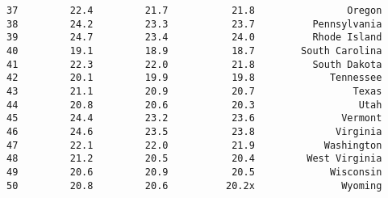 \documentclass[11pt]{article}
\begin{document}
\begin{Verbatim}[commandchars=\\\{\}]
37         22.4         21.7           21.8                Oregon   
38         24.2         23.3           23.7          Pennsylvania   
39         24.7         23.4           24.0          Rhode Island   
40         19.1         18.9           18.7        South Carolina   
41         22.3         22.0           21.8          South Dakota   
42         20.1         19.9           19.8             Tennessee   
43         21.1         20.9           20.7                 Texas   
44         20.8         20.6           20.3                  Utah   
45         24.4         23.2           23.6               Vermont   
46         24.6         23.5           23.8              Virginia   
47         22.1         22.0           21.9            Washington   
48         21.2         20.5           20.4         West Virginia   
49         20.6         20.9           20.5             Wisconsin   
50         20.8         20.6          20.2x               Wyoming   


\end{Verbatim}
\end{document}
